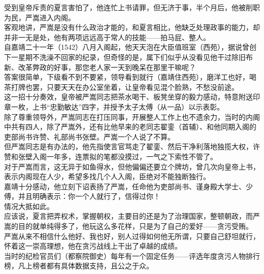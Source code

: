 \begin{multicols}{\theparacolNo}
受到皇帝斥责的夏言害怕了，他连忙上书请罪，但无济于事，半个月后，他被削职为民，严嵩进入内阁。\\

客观地讲，严嵩是没有什么政治才能的，和夏言相比，他缺乏处理政事的能力，却并非一无是处，他有两项远远高于常人的技能——拍马屁、整人。\\

自嘉靖二十一年（1542）八月入阁起，他天天泡在大臣值班室（西苑），据说曾创下一星期不洗澡不回家的纪录，但奇怪的是，属下们似乎从没看见他干过除旧布新、改革弊政的好事，那您老人家一天到晚呆在那里干嘛呢？\\

答案很简单，下级看不到不要紧，领导看到就行（嘉靖住西苑），磨洋工也好，喝茶打牌也罢，只要天天在办公室坐着，让皇帝看见混个脸熟，不愁没前途。\\

这一招十分奏效，皇帝被严嵩同志把茶水喝干、板凳坐穿的毅力感动，特意附送印章一枚，上书“忠勤敏达”四字，并授予太子太傅（从一品）以示表彰。\\

除了尊重领导外，严嵩同志在打压同事，开展整人工作上也不遗余力，当时的内阁中共有四人，除了严嵩外，还有比他早来的老同志翟銮（首辅）、和他同期入阁的吏部尚书许赞、礼部尚书张壁。严嵩一个人说了不算。\\

但严嵩同志是有办法的，他先指使言官骂走了翟銮、然后干净利落地独揽大权，许赞和张壁入阁一年多，连票拟的笔都没摸过，一气之下索性不管了。\\

对于严嵩而言，这无异于如鱼得水，但他偏偏还要立个牌坊，曾几次向皇帝上书，表示内阁现在人少，希望多找几个人入阁，臣绝对不能独断独行。\\

嘉靖十分感动，他立刻下诏表扬了严嵩，任命他为吏部尚书、谨身殿大学士、少傅，并且明确表示：你一个人就行了，信得过你！\\

情况大抵如此。\\

应该说，夏言把弄权术，掌握朝权，主要目的还是为了治理国家，整顿朝政，而严嵩的目的就单纯得多了，他玩这么多花样，只是为了自己的爱好——贪污受贿。\\

严嵩从来不相信什么他好、我也好，别人过得如何他无所谓，只要自己舒坦就行，怀着这一崇高理想，他在贪污战线上干出了卓越的成绩。\\

当时的纪检官员们（都察院御史）每年有一个固定任务——评选年度贪污人物排行榜，凡上榜者都有具体数据支持，且公之于众。\\


\end{multicols}
